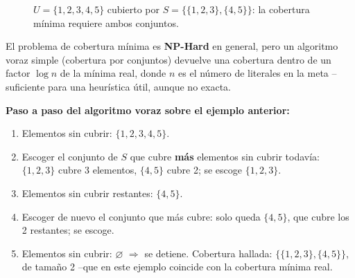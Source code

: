 \begin{figure}[H]
\centering
{}
\caption{$U=\{1,2,3,4,5\}$ cubierto por $S=\{\{1,2,3\},\{4,5\}\}$: la cobertura mínima requiere
ambos conjuntos.}
\end{figure}

El problema de cobertura mínima es \textbf{NP-Hard} en general, pero un algoritmo voraz simple
(cobertura por conjuntos) devuelve una cobertura dentro de un factor $\log n$ de la mínima real,
donde $n$ es el número de literales en la meta --suficiente para una heurística útil, aunque no
exacta.

\textbf{Paso a paso del algoritmo voraz sobre el ejemplo anterior:}
\begin{enumerate}
    \item Elementos sin cubrir: $\{1,2,3,4,5\}$.
    \item Escoger el conjunto de $S$ que cubre \textbf{más} elementos sin cubrir todavía:
    $\{1,2,3\}$ cubre 3 elementos, $\{4,5\}$ cubre 2; se escoge $\{1,2,3\}$.
    \item Elementos sin cubrir restantes: $\{4,5\}$.
    \item Escoger de nuevo el conjunto que más cubre: solo queda $\{4,5\}$, que cubre los 2
    restantes; se escoge.
    \item Elementos sin cubrir: $\varnothing$ $\Rightarrow$ se detiene. Cobertura hallada:
    $\{\{1,2,3\},\{4,5\}\}$, de tamaño 2 --que en este ejemplo coincide con la cobertura mínima real.
\end{enumerate}

